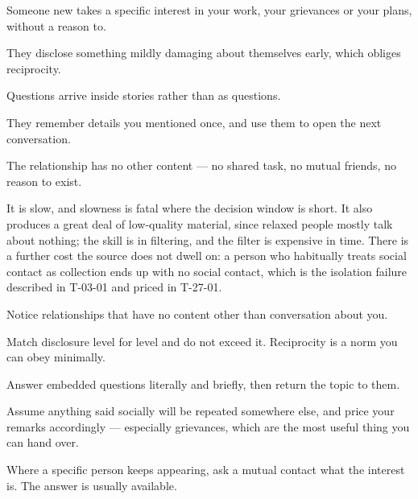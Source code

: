 \begin{feedback}
  \item Someone new takes a specific interest in your work, your grievances or your plans, without a reason to.
  \item They disclose something mildly damaging about themselves early, which obliges reciprocity.
  \item Questions arrive inside stories rather than as questions.
  \item They remember details you mentioned once, and use them to open the next conversation.
  \item The relationship has no other content --- no shared task, no mutual friends, no reason to exist.
\end{feedback}

\begin{failure}
It is slow, and slowness is fatal where the decision window is short. It also produces a great deal of low-quality material, since relaxed people mostly talk about nothing; the skill is in filtering, and the filter is expensive in time. There is a further cost the source does not dwell on: a person who habitually treats social contact as collection ends up with no social contact, which is the isolation failure described in T-03-01 and priced in T-27-01.
\end{failure}

\begin{countermeasures}
  \item Notice relationships that have no content other than conversation about you.
  \item Match disclosure level for level and do not exceed it. Reciprocity is a norm you can obey minimally.
  \item Answer embedded questions literally and briefly, then return the topic to them.
  \item Assume anything said socially will be repeated somewhere else, and price your remarks accordingly --- especially grievances, which are the most useful thing you can hand over.
  \item Where a specific person keeps appearing, ask a mutual contact what the interest is. The answer is usually available.
\end{countermeasures}

\seesources
{}
